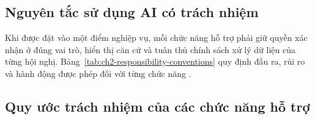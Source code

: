 \subsection{Nguyên tắc sử dụng AI có trách nhiệm}

Khi được đặt vào một điểm nghiệp vụ, mỗi chức năng hỗ trợ phải giữ quyền xác nhận ở đúng vai trò, hiển thị căn cứ và tuân thủ chính sách xử lý dữ liệu của từng hội nghị. Bảng~\ref{tab:ch2-responsibility-conventions} quy định đầu ra, rủi ro và hành động được phép đối với từng chức năng \cite{ch2ref19}.

\pagebreak
\subsection{Quy ước trách nhiệm của các chức năng hỗ trợ}

\begingroup
\setlength{\tabcolsep}{4pt}
\renewcommand{\arraystretch}{1.3}


